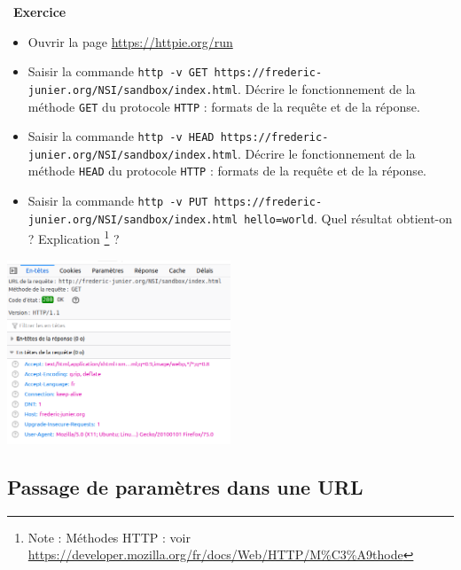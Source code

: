 \documentclass[
  11pt,
]{article}
\newcommand{\passthrough}[1]{#1}
\providecommand{\tightlist}{%
  \setlength{\itemsep}{0pt}\setlength{\parskip}{0pt}}
\newcounter{exo}
\newenvironment{exercice}[1]
{\par \medskip   \addtocounter{exo}{1} \noindent  
\begin{bclogo}[arrondi =0.1,   noborder = true, logo=\bccrayon, marge=4]{~\textbf{Exercice} \textbf{\theexo} {\itshape #1} }  \par}
{
\end{bclogo}
 \par \bigskip }
\begin{document}
\begin{exercice}{}
\begin{enumerate}
  \begin{itemize}
  \tightlist
  \item
    Ouvrir la page \url{https://httpie.org/run}
  \item
    Saisir la commande
    \passthrough{\lstinline!http -v GET https://frederic-junier.org/NSI/sandbox/index.html!}.
    Décrire le fonctionnement de la méthode
    \passthrough{\lstinline!GET!} du protocole
    \passthrough{\lstinline!HTTP!} : formats de la requête et de la
    réponse.
  \item
    Saisir la commande
    \passthrough{\lstinline!http -v HEAD https://frederic-junier.org/NSI/sandbox/index.html!}.
    Décrire le fonctionnement de la méthode
    \passthrough{\lstinline!HEAD!} du protocole
    \passthrough{\lstinline!HTTP!} : formats de la requête et de la
    réponse.
  \item
    Saisir la commande
    \passthrough{\lstinline!http -v PUT https://frederic-junier.org/NSI/sandbox/index.html hello=world!}.
    Quel résultat obtient-on ? Explication \footnote{Note : Méthodes
      HTTP : voir
      \url{https://developer.mozilla.org/fr/docs/Web/HTTP/M\%C3\%A9thode}}
    ?
  \end{itemize}
\end{enumerate}

\includegraphics[width=0.5\textwidth,height=\textheight]{images/header-http1.png}\\

\end{exercice}

\hypertarget{passage-de-paramuxe8tres-dans-une-url}{%
\subsection{Passage de paramètres dans une
URL}\label{passage-de-paramuxe8tres-dans-une-url}}
\end{document}
